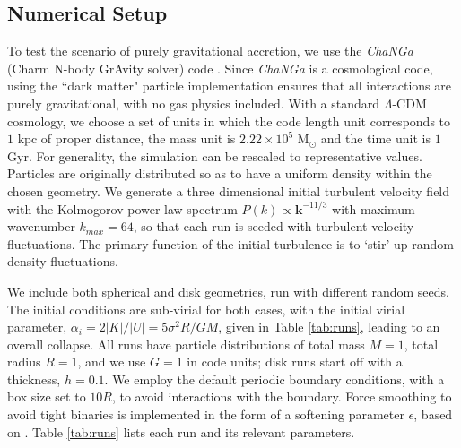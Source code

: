 \documentclass[iop]{emulateapj}
\begin{document}
\subsection{Numerical Setup}
\par To test the scenario of purely gravitational accretion, we use the \emph{ChaNGa} (Charm N-body GrAvity solver) code \citep{jetley08,menon15}. Since \emph{ChaNGa} is a cosmological code, using the ``dark matter" particle implementation ensures that all interactions are purely gravitational, with no gas physics included. With a standard $\Lambda$-CDM cosmology, we choose a set of units in which the code length unit corresponds to $1 $ $\mathrm{kpc}$ of proper distance, the mass unit is $2.22 \times 10^{5}$ $\mathrm{M_{\odot}}$ and the time unit is  $1$ $\mathrm{Gyr}$. For generality, the simulation can be rescaled to representative values. Particles are originally distributed so as to have a uniform density within the chosen geometry. We generate a three dimensional initial turbulent velocity field with the Kolmogorov power law spectrum $P(k) \propto \mathbf{k}^{-11/3}$ with maximum wavenumber $k_{max} = 64$, so that each run is seeded with turbulent velocity fluctuations. The primary function of the initial turbulence is to `stir' up random density fluctuations. 
\par We include both spherical and disk geometries, run with different random seeds. The initial conditions are sub-virial for both cases, with the initial virial parameter, $\alpha_i = 2 |K|/|U| =  5\sigma^2R /GM$, given in Table \ref{tab:runs}, leading to an overall collapse. All runs have particle distributions of total mass $M=1$, total radius $R=1$, and we use $G=1$ in code units; disk runs start off with a thickness, $h=0.1$. We employ the default periodic boundary conditions, with a box size set to $10R$, to avoid interactions with the boundary. Force smoothing to avoid tight binaries is implemented in the form of a softening parameter $\epsilon$, based on \cite{dehnen01}. Table \ref{tab:runs} lists each run and its relevant parameters.  
\end{document}
